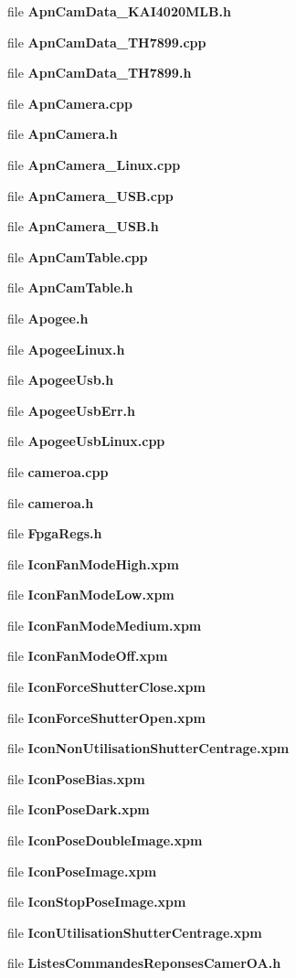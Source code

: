 \begin{CompactItemize}
\item 
file {\bf Apn\-Cam\-Data\_\-KAI4020MLB.h}
\item 
file {\bf Apn\-Cam\-Data\_\-TH7899.cpp}
\item 
file {\bf Apn\-Cam\-Data\_\-TH7899.h}
\item 
file {\bf Apn\-Camera.cpp}
\item 
file {\bf Apn\-Camera.h}
\item 
file {\bf Apn\-Camera\_\-Linux.cpp}
\item 
file {\bf Apn\-Camera\_\-USB.cpp}
\item 
file {\bf Apn\-Camera\_\-USB.h}
\item 
file {\bf Apn\-Cam\-Table.cpp}
\item 
file {\bf Apn\-Cam\-Table.h}
\item 
file {\bf Apogee.h}
\item 
file {\bf Apogee\-Linux.h}
\item 
file {\bf Apogee\-Usb.h}
\item 
file {\bf Apogee\-Usb\-Err.h}
\item 
file {\bf Apogee\-Usb\-Linux.cpp}
\item 
file {\bf cameroa.cpp}
\item 
file {\bf cameroa.h}
\item 
file {\bf Fpga\-Regs.h}
\item 
file {\bf Icon\-Fan\-Mode\-High.xpm}
\item 
file {\bf Icon\-Fan\-Mode\-Low.xpm}
\item 
file {\bf Icon\-Fan\-Mode\-Medium.xpm}
\item 
file {\bf Icon\-Fan\-Mode\-Off.xpm}
\item 
file {\bf Icon\-Force\-Shutter\-Close.xpm}
\item 
file {\bf Icon\-Force\-Shutter\-Open.xpm}
\item 
file {\bf Icon\-Non\-Utilisation\-Shutter\-Centrage.xpm}
\item 
file {\bf Icon\-Pose\-Bias.xpm}
\item 
file {\bf Icon\-Pose\-Dark.xpm}
\item 
file {\bf Icon\-Pose\-Double\-Image.xpm}
\item 
file {\bf Icon\-Pose\-Image.xpm}
\item 
file {\bf Icon\-Stop\-Pose\-Image.xpm}
\item 
file {\bf Icon\-Utilisation\-Shutter\-Centrage.xpm}
\item 
file {\bf Listes\-Commandes\-Reponses\-Camer\-OA.h}

\end{CompactItemize}
